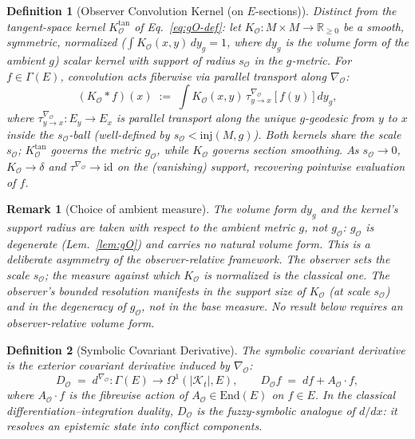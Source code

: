 \documentclass[11pt]{article}
\newtheorem{definition}{Definition}
\newtheorem{remark}{Remark}
\newcommand{\Kt}{\mathcal{K}_t}
\newcommand{\sO}{s_{\mathcal{O}}}  %
\newcommand{\Obs}{\mathcal{O}}
\newcommand{\nablaO}{\nabla_{\Obs}}
\newcommand{\AO}{A_{\Obs}}
\newcommand{\gO}{g_{\Obs}}
\newcommand{\KO}{K_{\Obs}}
\newcommand{\DO}{D_{\Obs}}
\newcommand{\EE}{E}
\newcommand{\End}{\mathrm{End}}
\newcommand{\Sect}{\Gamma}
\begin{document}
\begin{definition}[Observer Convolution Kernel (on $\EE$-sections)]
\label{def:kernel}
Distinct from the tangent-space kernel $\KO^{\mathrm{tan}}$ of
Eq.~\eqref{eq:gO-def}: let $\KO: M \times M \to \mathbb{R}_{\geq 0}$
be a smooth, symmetric, normalized ($\int \KO(x, y)\,dy_g = 1$, where
$dy_g$ is the volume form of the ambient $g$) scalar kernel with
support of radius $\sO$ in the $g$-metric. For $f \in \Sect(\EE)$,
convolution acts fiberwise via parallel transport along $\nablaO$:
\[
(\KO * f)(x) \;:=\; \int \KO(x, y)\, \tau^{\nablaO}_{y \to x}\!\left[f(y)\right] dy_g,
\]
where $\tau^{\nablaO}_{y \to x}: \EE_y \to \EE_x$ is parallel
transport along the unique $g$-geodesic from $y$ to $x$ inside the
$\sO$-ball (well-defined by $\sO < \mathrm{inj}(M, g)$). Both
kernels share the scale $\sO$; $\KO^{\mathrm{tan}}$ governs the
metric $\gO$, while $\KO$ governs section smoothing. As
$\sO \to 0$, $\KO \to \delta$ and
$\tau^{\nablaO} \to \mathrm{id}$ on the (vanishing) support,
recovering pointwise evaluation of $f$.
\end{definition}

\begin{remark}[Choice of ambient measure]
\label{rem:ambient-measure}
The volume form $dy_g$ and the kernel's support radius are taken with
respect to the ambient metric $g$, not $\gO$: $\gO$ is degenerate
(Lem.~\ref{lem:gO}) and carries no natural volume form. This is a
deliberate asymmetry of the observer-relative framework. The observer
sets the \emph{scale} $\sO$; the \emph{measure} against which $\KO$
is normalized is the classical one. The observer's bounded resolution
manifests in the support size of $\KO$ (at scale $\sO$) and in the
degeneracy of $\gO$, not in the base measure. No result below
requires an observer-relative volume form.
\end{remark}

\begin{definition}[Symbolic Covariant Derivative]
\label{def:cov}
The \emph{symbolic covariant derivative} is the exterior covariant
derivative induced by $\nablaO$:
\[
\DO \;=\; d^{\nablaO}: \Sect(\EE) \to \Omega^1(|\Kt|, \EE),
\qquad \DO f \;=\; df + \AO \cdot f,
\]
where $\AO \cdot f$ is the fibrewise action of $\AO \in \End(\EE)$ on
$f \in \EE$. In the classical differentiation--integration duality,
$\DO$ is the fuzzy-symbolic analogue of $d/dx$: it resolves an
epistemic state into conflict components.
\end{definition}
\end{document}
